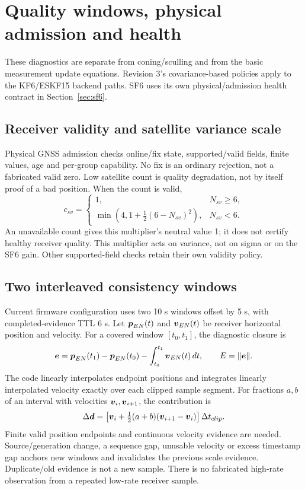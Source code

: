 \section{Quality windows, physical admission and health}
\label{sec:diagnostics}
These diagnostics are separate from coning/sculling and from the basic measurement update equations. Revision 3's covariance-based policies apply to the KF6/ESKF15 backend paths. SF6 uses its own physical/admission health contract in Section~\ref{sec:sf6}.

\subsection{Receiver validity and satellite variance scale}
Physical GNSS admission checks online/fix state, supported/valid fields, finite values, age and per-group capability. No fix is an ordinary rejection, not a fabricated valid zero. Low satellite count is quality degradation, not by itself proof of a bad position. When the count is valid,
\begin{equation}
c_{sv}=\begin{cases}
1,&N_{sv}\ge6,\\
\min(4,1+\tfrac12(6-N_{sv})^2),&N_{sv}<6.
\end{cases}
\end{equation}
An unavailable count gives this multiplier's neutral value 1; it does not certify healthy receiver quality. This multiplier acts on variance, not on sigma or on the SF6 gain. Other supported-field checks retain their own validity policy.

\subsection{Two interleaved consistency windows}
Current firmware configuration uses two 10 s windows offset by 5 s, with completed-evidence TTL 6 s. Let $\boldsymbol{p}_{EN}(t)$ and $\boldsymbol{v}_{EN}(t)$ be receiver horizontal position and velocity. For a covered window $[t_0,t_1]$, the diagnostic closure is
\begin{equation}
\boldsymbol{e}=\boldsymbol{p}_{EN}(t_1)-\boldsymbol{p}_{EN}(t_0)
-\int_{t_0}^{t_1}\boldsymbol{v}_{EN}(t)\,dt,\qquad E=\lVert \boldsymbol{e}\rVert.
\label{eq:closure}
\end{equation}
The code linearly interpolates endpoint positions and integrates linearly interpolated velocity exactly over each clipped sample segment. For fractions $a,b$ of an interval with velocities $\boldsymbol{v}_i,\boldsymbol{v}_{i+1}$, the contribution is
\begin{equation}
\Delta\boldsymbol{d}=\left[\boldsymbol{v}_i+\tfrac12(a+b)(\boldsymbol{v}_{i+1}-\boldsymbol{v}_i)\right]\Delta t_{clip}.
\end{equation}
Finite valid position endpoints and continuous velocity evidence are needed. Source/generation change, a sequence gap, unusable velocity or excess timestamp gap anchors new windows and invalidates the previous scale evidence. Duplicate/old evidence is not a new sample. There is no fabricated high-rate observation from a repeated low-rate receiver sample.

